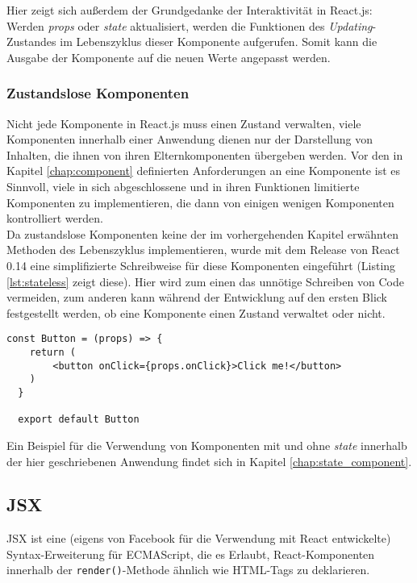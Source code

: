 Hier zeigt sich außerdem der Grundgedanke der Interaktivität in React.js: Werden \textit{props} oder \textit{state} aktualisiert, werden die Funktionen des \textit{Updating}-Zustandes im Lebenszyklus dieser Komponente aufgerufen. Somit kann die Ausgabe der Komponente auf die neuen Werte angepasst werden.

\subsubsection{Zustandslose Komponenten}
\label{chap:stateless}
Nicht jede Komponente in React.js muss einen Zustand verwalten, viele Komponenten innerhalb einer Anwendung dienen nur der Darstellung von Inhalten, die ihnen von ihren Elternkomponenten übergeben werden. Vor den in Kapitel \ref{chap:component} definierten Anforderungen an eine Komponente ist es Sinnvoll, viele in sich abgeschlossene und in ihren Funktionen limitierte Komponenten zu implementieren, die dann von einigen wenigen Komponenten kontrolliert werden.\\
Da zustandslose Komponenten keine der im vorhergehenden Kapitel erwähnten Methoden des Lebenszyklus implementieren, wurde mit dem Release von React 0.14\footnotemark{} eine simplifizierte Schreibweise für diese Komponenten eingeführt (Listing \ref{lst:stateless} zeigt diese). Hier wird zum einen das unnötige Schreiben von Code vermeiden, zum anderen kann während der Entwicklung auf den ersten Blick festgestellt werden, ob eine Komponente einen Zustand verwaltet oder nicht.


\begin{lstlisting}[caption={Simplifizierte Schreibweise für Komponenten ohne \textit{state}}, label=lst:stateless]
  const Button = (props) => {
  	return (
  		<button onClick={props.onClick}>Click me!</button>
  	)
  }

  export default Button
\end{lstlisting}

Ein Beispiel für die Verwendung von Komponenten mit und ohne \textit{state} innerhalb der hier geschriebenen Anwendung findet sich in Kapitel \ref{chap:state_component}.

\subsection{JSX}
\label{chap:jsx}
JSX ist eine (eigens von Facebook für die Verwendung mit React entwickelte) Syntax-Erweiterung für ECMAScript, die es Erlaubt, React-Komponenten innerhalb der \verb|render()|-Methode ähnlich wie HTML-Tags zu deklarieren.

